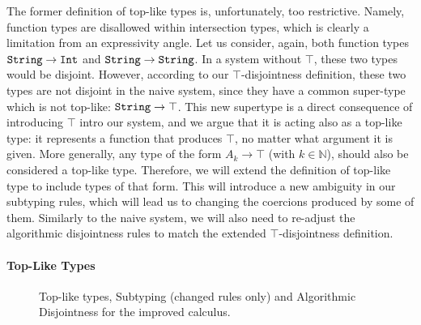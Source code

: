 The former definition of top-like types is, unfortunately, too restrictive.
Namely, function types are disallowed within intersection types, which is clearly a limitation from an expressivity
angle.
Let us consider, again, both function types $\texttt{String} \to \texttt{Int}$ and $\texttt{String} \to \texttt{String}$. 
In a system without $\top$, these two types would be disjoint.
However, according to our $\top$-disjointness definition, these two types are not disjoint in the naive system, since they have a 
common super-type which is not top-like:
$\texttt{String} \to \top$.
This new supertype is a direct consequence of introducing $\top$ intro our system,
and we argue that it is acting also as a top-like type: it represents a function that produces
$\top$, no matter what argument it is given.
More generally, any type of the form $A_k \to \top$ (with $k \in \mathbb{N}$), should also be considered a top-like type.
Therefore, we will extend the definition of top-like type to include types of that form. 
This will introduce a new ambiguity in our subtyping rules, which will lead us to changing the coercions produced by some
of them.
Similarly to the naive system, we will also need to re-adjust the algorithmic disjointness rules to match the 
extended $\top$-disjointness definition. 

\paragraph{Top-Like Types}

\begin{figure}[h]




  \caption{Top-like types, Subtyping (changed rules only) and Algorithmic Disjointness for the improved calculus.}
  \label{fig:tltypesextdis}
\end{figure}

